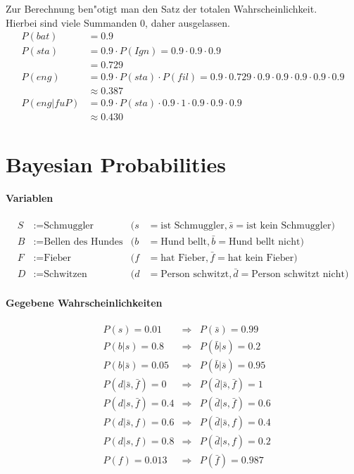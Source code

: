 \documentclass[DIV=9,numbers=noenddot]{scrartcl}
\begin{document}
		Zur Berechnung ben"otigt man den Satz der totalen Wahrscheinlichkeit.\\
		Hierbei sind viele Summanden 0, daher ausgelassen.
		\begin{align*}
			P(bat) &= 0.9 \\
			P(sta) &= 0.9 \cdot P(Ign) = 0.9 \cdot 0.9 \cdot 0.9 \\
			&= 0.729 \\
			P(eng) &= 0.9 \cdot P(sta) \cdot P(fil) = 0.9 \cdot 0.729 \cdot 0.9 \cdot 0.9 \cdot 0.9 \cdot 0.9 \cdot 0.9 \\
			&\approx 0.387 \\
			P(eng|fuP) &= 0.9 \cdot P(sta) \cdot 0.9 \cdot 1 \cdot 0.9 \cdot 0.9 \cdot 0.9 \\
			&\approx 0.430
		\end{align*}
	\section{Bayesian Probabilities}
		\paragraph{Variablen}
			\begin{align*}
				  S&:= \text{Schmuggler} &(s &= \text{ist Schmuggler}, \bar{s} = \text{ist kein Schmuggler})
				\\B&:= \text{Bellen des Hundes} &(b &= \text{Hund bellt}, \bar{b} = \text{Hund bellt nicht})
				\\F&:= \text{Fieber} &(f &= \text{hat Fieber}, \bar{f} = \text{hat kein Fieber})
				\\D&:= \text{Schwitzen} &(d &= \text{Person schwitzt}, \bar{d} = \text{Person schwitzt nicht})
			\end{align*}
		\paragraph{Gegebene Wahrscheinlichkeiten}
			\begin{align*}
				  &P(s)                 = 0.01  &\Rightarrow &P(\bar{s})                 = 0.99
				\\&P(b|s)               = 0.8   &\Rightarrow &P(\bar{b}|s)               = 0.2
				\\&P(b|\bar{s})         = 0.05  &\Rightarrow &P(\bar{b}|\bar{s})         = 0.95
				\\&P(d|\bar{s},\bar{f}) = 0     &\Rightarrow &P(\bar{d}|\bar{s},\bar{f}) = 1
				\\&P(d|s,\bar{f})       = 0.4   &\Rightarrow &P(\bar{d}|s,\bar{f})       = 0.6
				\\&P(d|\bar{s},f)       = 0.6   &\Rightarrow &P(\bar{d}|\bar{s},f)       = 0.4
				\\&P(d|s,f)             = 0.8   &\Rightarrow &P(\bar{d}|s,f)             = 0.2
				\\&P(f)                 = 0.013 &\Rightarrow &P(\bar{f})                 = 0.987
			\end{align*}
\end{document}
